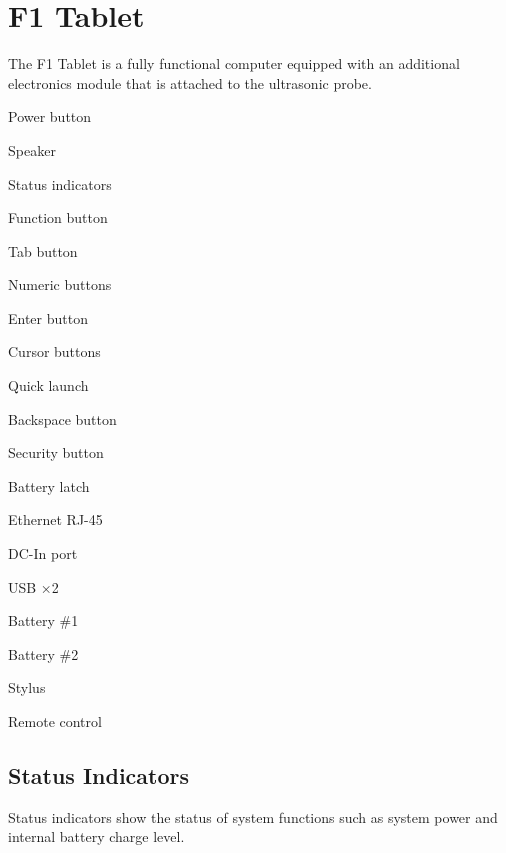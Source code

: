 \chapter[f1-tablet]{F1 Tablet}

The F1 Tablet is a fully functional computer equipped with an additional
electronics module that is attached to the ultrasonic probe.


\startnarrow[middle=3em]
\startcolumns[n=3]
\startitemize[n,packed][stopper=.]
\item
Power button
\item
Speaker
\item
Status indicators
\item
Function button
\item
Tab button
\item
Numeric buttons
\item
Enter button
\item
Cursor buttons
\item
Quick launch
\item
Backspace button
\item
Security button
\item
Battery latch
\item
Ethernet RJ-45
\item
DC-In port
\item
USB ×2
\item
Battery \#1
\item
Battery \#2
\item
Stylus
\item
Remote control
\stopitemize
\stopcolumns
\stopnarrow

\section[status-indicators]{Status Indicators}

Status indicators show the status of system functions such as system power and
internal battery charge level.


